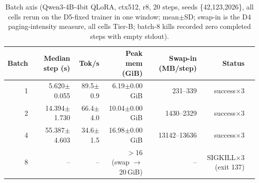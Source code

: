 \begin{table}[t]\centering
\caption{Batch axis (Qwen3-4B-4bit QLoRA, ctx512, r8, 20 steps, seeds \{42,123,2026\}, all cells rerun on the D5-fixed trainer in one window; mean$\pm$SD; swap-in is the D4 paging-intensity measure, all cells Tier-B; batch-8 kills recorded zero completed steps with empty stdout).}
\label{tab:batch}
\footnotesize\setlength{\tabcolsep}{2.8pt}
\begin{tabular}{rrrrrrl}
\toprule
Batch & Median step (s) & Tok/s & Peak mem (GiB) & Swap-in (MB/step) & Status\\
\midrule
1 & 5.620$\pm$0.055 & 89.5$\pm$0.9 & 6.19$\pm$0.00 GiB & 231--339 & success$\times$3\\
2 & 14.394$\pm$1.730 & 66.4$\pm$4.0 & 10.04$\pm$0.00 GiB & 1430--2329 & success$\times$3\\
4 & 55.387$\pm$4.603 & 34.6$\pm$1.5 & 16.98$\pm$0.00 GiB & 13142--13636 & success$\times$3\\
8 & -- & -- & $>$16 (swap $\to$20\,GiB) & -- & SIGKILL$\times$3 (exit 137)\\
\bottomrule
\end{tabular}
\end{table}
